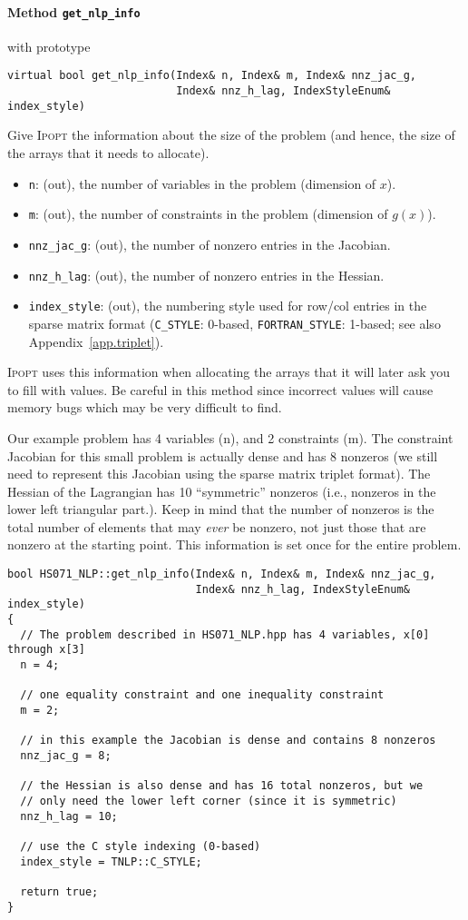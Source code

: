 \documentclass[10pt]{article}
\newcommand{\Ipopt}{\textsc{Ipopt}\xspace}
\begin{document}
\paragraph{Method {\texttt{get\_nlp\_info}}} with prototype
\begin{verbatim}
virtual bool get_nlp_info(Index& n, Index& m, Index& nnz_jac_g,
                          Index& nnz_h_lag, IndexStyleEnum& index_style)
\end{verbatim}
Give \Ipopt the information about the size of the problem (and hence,
the size of the arrays that it needs to allocate). 
\begin{itemize}
\item {\tt n}: (out), the number of variables in the problem (dimension of $x$).
\item {\tt m}: (out), the number of constraints in the problem (dimension of $g(x)$).
\item {\tt nnz\_jac\_g}: (out), the number of nonzero entries in the Jacobian.
\item {\tt nnz\_h\_lag}: (out), the number of nonzero entries in the Hessian.
\item {\tt index\_style}: (out), the numbering style used for row/col entries in the sparse matrix
format ({\tt C\_STYLE}: 0-based, {\tt FORTRAN\_STYLE}: 1-based; see
also Appendix~\ref{app.triplet}).
\end{itemize}
\Ipopt uses this information when allocating the arrays that
it will later ask you to fill with values. Be careful in this method
since incorrect values will cause memory bugs which may be very
difficult to find.

Our example problem has 4 variables (n), and 2 constraints (m). The
constraint Jacobian for this small problem is actually dense and has 8
nonzeros (we still need to represent this Jacobian using the sparse
matrix triplet format). The Hessian of the Lagrangian has 10
``symmetric'' nonzeros (i.e., nonzeros in the lower left triangular
part.).  Keep in mind that the number of nonzeros is the total number
of elements that may \emph{ever} be nonzero, not just those that are
nonzero at the starting point. This information is set once for the
entire problem.

\begin{footnotesize}
\begin{verbatim}
bool HS071_NLP::get_nlp_info(Index& n, Index& m, Index& nnz_jac_g, 
                             Index& nnz_h_lag, IndexStyleEnum& index_style)
{
  // The problem described in HS071_NLP.hpp has 4 variables, x[0] through x[3]
  n = 4;

  // one equality constraint and one inequality constraint
  m = 2;

  // in this example the Jacobian is dense and contains 8 nonzeros
  nnz_jac_g = 8;

  // the Hessian is also dense and has 16 total nonzeros, but we
  // only need the lower left corner (since it is symmetric)
  nnz_h_lag = 10;

  // use the C style indexing (0-based)
  index_style = TNLP::C_STYLE;

  return true;
}
\end{verbatim}
\end{footnotesize}
\end{document}
